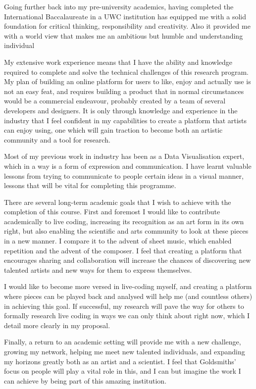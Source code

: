 \documentclass[12pt]{article}
\begin{document}
Going further back into my pre-university academics, having completed the International Baccalaureate in a UWC institution has equipped me with a solid foundation for critical thinking, responsibility and creativity. Also it provided me with a world view that makes me an ambitious but humble and understanding individual

My extensive work experience means that I have the ability and knowledge required to complete and solve the technical challenges of this research program. My plan of building an online platform for users to like, enjoy and actually use is not an easy feat, and requires building a product that in normal circumstances would be a commercial endeavour, probably created by a team of several developers and designers. It is only through knowledge and experience in the industry that I feel confident in my capabilities to create a platform that artists can enjoy using, one which will gain traction to become both an artistic community and a tool for research.

Most of my previous work in industry has been as a Data Visualisation expert, which in a way is a form of expression and communication. I have learnt valuable lessons from trying to communicate to people certain ideas in a visual manner, lessons that will be vital for completing this programme. 

There are several long-term academic goals that I wish to achieve with the completion of this course. First and foremost I would like to contribute academically to live coding, increasing its recognition as an art form in its own right, but also enabling the scientific and arts community to look at these pieces in a new manner. I compare it to the advent of sheet music, which enabled repetition and the advent of the composer. I feel that creating a platform that encourages sharing and collaboration will increase the chances of discovering new talented artists and new ways for them to express themselves.

I would like to become more versed in live-coding myself, and creating a platform where pieces can be played back and analysed will help me (and countless others) in achieving this goal. If successful, my research will pave the way for others to formally research live coding in ways we can only think about right now, which I detail more clearly in my proposal. 

Finally, a return to an academic setting will provide me with a new challenge, growing my network, helping me meet new talented individuals, and expanding my horizons greatly both as an artist and a scientist. I feel that Goldsmiths’ focus on people will play a vital role in this, and I can but imagine the work I can achieve by being part of this amazing institution.
\end{document}
